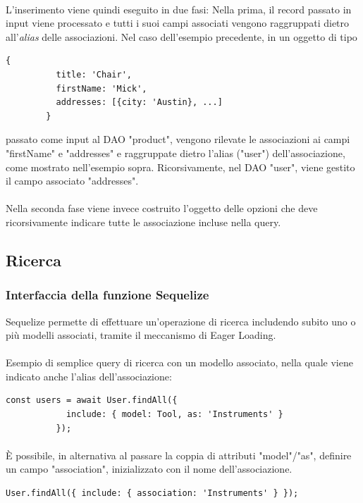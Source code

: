 \documentclass[a4paper, 12pt]{report}
\begin{document}
      \paragraph*{}
      L'inserimento viene quindi eseguito in due fasi:
      Nella prima, il record passato in input viene processato e tutti i suoi campi associati vengono raggruppati dietro all'\emph{alias} delle associazioni.
      Nel caso dell'esempio precedente, in un oggetto di tipo
      \begin{Verbatim}[samepage=true]
        {
          title: 'Chair', 
          firstName: 'Mick',
          addresses: [{city: 'Austin}, ...]
        }
      \end{Verbatim}
      passato come input al DAO "product", vengono rilevate le associazioni ai campi "firstName" e "addresses" e raggruppate dietro l'alias ("user") dell'associazione, come mostrato nell'esempio sopra.
      Ricorsivamente, nel DAO "user", viene gestito il campo associato "addresses".
      \paragraph*{}
      Nella seconda fase viene invece costruito l'oggetto delle opzioni che deve ricorsivamente indicare tutte le associazione incluse nella query.
    \newpage
    \subsection{Ricerca}
      \subsubsection*{Interfaccia della funzione Sequelize}
        Sequelize permette di effettuare un'operazione di ricerca includendo subito uno o più modelli associati, tramite il meccanismo di Eager Loading.
        \paragraph*{}
        Esempio di semplice query di ricerca con un modello associato, nella quale viene indicato anche l'alias dell'associazione:
        \begin{Verbatim}[samepage=true]
          const users = await User.findAll({
            include: { model: Tool, as: 'Instruments' }
          });
        \end{Verbatim}
        \paragraph*{}
        È possibile, in alternativa al passare la coppia di attributi "model"/"as", definire un campo "association", inizializzato con il nome dell'associazione.
        \begin{Verbatim}[samepage=true]
          User.findAll({ include: { association: 'Instruments' } });
        \end{Verbatim}
\end{document}
